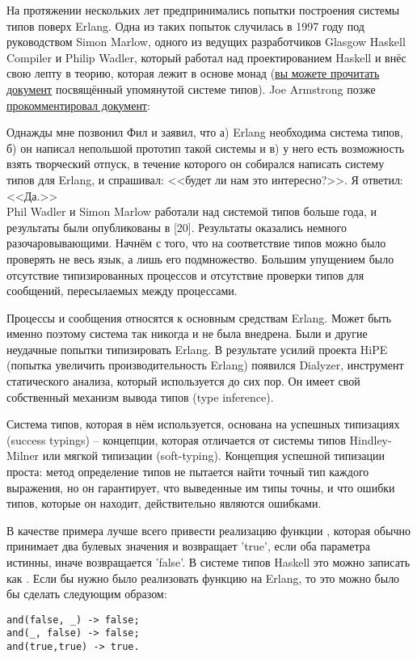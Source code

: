 На протяжении нескольких лет предпринимались попытки построения системы типов поверх Erlang.
Одна из таких попыток случилась в 1997 году под руководством Simon Marlow, одного из ведущих разработчиков Glasgow Haskell Compiler и Philip Wadler, который работал над проектированием Haskell и внёс свою лепту в теорию, которая лежит в основе монад (\href{http://www.haskell.org/~simonmar/papers/erltc.pdf}{вы можете прочитать документ} посвящённый упомянутой системе типов).
Joe Armstrong позже \href{http://www.cs.chalmers.se/Cs/Grundutb/Kurser/ppxt/HT2007/general/languages/armstrong-erlang\_history.pdf}{прокомментировал документ}:\\
\colorbox{lgray}
{
    \begin{minipage}{\linewidth}
Однажды мне позвонил Фил и заявил, что а) Erlang необходима система типов, б) он написал непольшой прототип такой системы и в) у него есть возможность взять творческий отпуск, в течение которого он собирался написать систему типов для Erlang, и спрашивал: <<будет ли нам это интересно?>>.
Я ответил: <<Да.>>\\
Phil Wadler и Simon Marlow работали над системой типов больше года, и результаты были опубликованы в [20].
Результаты оказались немного разочаровывающими.
Начнём с того, что на соответствие типов можно было проверять не весь язык, а лишь его подмножество.
Большим упущением было отсутствие типизированных процессов и отсутствие проверки типов для сообщений, пересылаемых между процессами.
    \end{minipage}
}

Процессы и сообщения относятся к основным средствам Erlang.
Может быть именно поэтому система так никогда и не была внедрена.
Были и другие неудачные попытки типизировать Erlang.
В результате усилий проекта HiPE (попытка увеличить производительность Erlang) появился Dialyzer, инструмент статического анализа, который используется до сих пор.
Он имеет свой собственный механизм вывода типов (type inference).

Система типов, которая в нём используется, основана на успешных типизациях (success typings) \--- концепции, которая отличается от системы типов Hindley\--Milner или мягкой типизации (soft\--typing).
Концепция успешной типизации проста: метод определение типов не пытается найти точный тип каждого выражения, но он гарантирует, что выведенные им типы точны, и что ошибки типов, которые он находит, действительно являются ошибками.

В качестве примера лучше всего привести реализацию функции , которая обычно принимает два булевых значения и возвращает 'true', если оба параметра истинны, иначе возвращается 'false'.
В системе типов Haskell это можно записать как .
Если бы нужно было реализовать функцию  на Erlang, то это можно было бы сделать следующим образом:
\begin{lstlisting}[style=erlang]
and(false, _) -> false;
and(_, false) -> false;
and(true,true) -> true.
\end{lstlisting}


